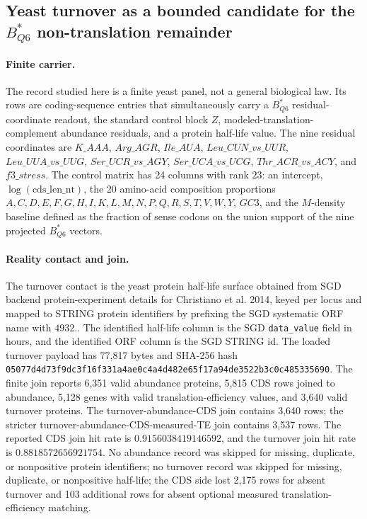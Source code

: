 \subsection{Yeast turnover as a bounded candidate for the $B^*_{Q6}$ non-translation remainder}
\label{subsec:bioreality-q6-turnover-candidate}

\paragraph{Finite carrier.}
The record studied here is a finite yeast panel, not a general biological law.  Its rows are coding-sequence entries that simultaneously carry a $B^*_{Q6}$ residual-coordinate readout, the standard control block $Z$, modeled-translation-complement abundance residuals, and a protein half-life value.  The nine residual coordinates are
$K\_AAA$, $Arg\_AGR$, $Ile\_AUA$, $Leu\_CUN\_vs\_UUR$, $Leu\_UUA\_vs\_UUG$, $Ser\_UCR\_vs\_AGY$, $Ser\_UCA\_vs\_UCG$, $Thr\_ACR\_vs\_ACY$, and $f3\_stress$.  The control matrix has 24 columns with rank $23$: an intercept, $\log(\mathrm{cds\_len\_nt})$, the 20 amino-acid composition proportions $A,C,D,E,F,G,H,I,K,L,M,N,P,Q,R,S,T,V,W,Y$, $GC3$, and the $M$-density baseline defined as the fraction of sense codons on the union support of the nine projected $B^*_{Q6}$ vectors.

\paragraph{Reality contact and join.}
The turnover contact is the yeast protein half-life surface obtained from SGD backend protein-experiment details for Christiano et al. 2014, keyed per locus and mapped to STRING protein identifiers by prefixing the SGD systematic ORF name with $4932.$.  The identified half-life column is the SGD \texttt{data\_value} field in hours, and the identified ORF column is the SGD STRING id.  The loaded turnover payload has 77,817 bytes and SHA-256 hash \texttt{05077d4d73f9dc3f16f331a4ae0c4a4d482e65f17a94de3522b3c0c485335690}.  The finite join reports 6,351 valid abundance proteins, 5,815 CDS rows joined to abundance, 5,128 genes with valid translation-efficiency values, and 3,640 valid turnover proteins.  The turnover-abundance-CDS join contains 3,640 rows; the stricter turnover-abundance-CDS-measured-TE join contains 3,537 rows.  The reported CDS join hit rate is $0.9156038419146592$, and the turnover join hit rate is $0.8818572656921754$.  No abundance record was skipped for missing, duplicate, or nonpositive protein identifiers; no turnover record was skipped for missing, duplicate, or nonpositive half-life; the CDS side lost 2,175 rows for absent turnover and 103 additional rows for absent optional measured translation-efficiency matching.

